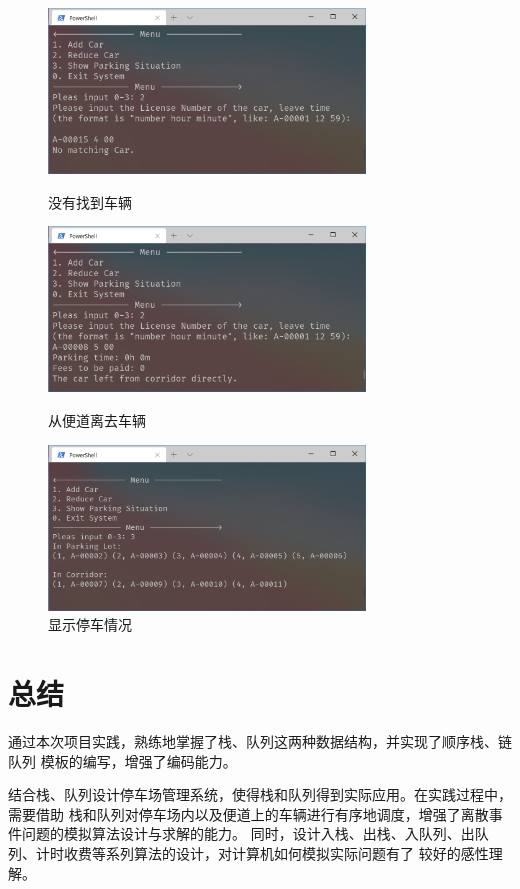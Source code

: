 \documentclass{ctexart}
\begin{document}
    \begin{figure}
        \centering
        \vspace{1em}
        \includegraphics[width=0.75\textwidth]{测试5.png}
        \caption{没有找到车辆}
        \vspace{1em}
        \includegraphics[width=0.75\textwidth]{测试6.png}
        \caption{从便道离去车辆}
        \vspace{1em}
        \includegraphics[width=0.75\textwidth]{测试7.png}
        \caption{显示停车情况}
    \end{figure}


    \section{总结}

    通过本次项目实践，熟练地掌握了栈、队列这两种数据结构，并实现了顺序栈、链队列
    模板的编写，增强了编码能力。

    结合栈、队列设计停车场管理系统，使得栈和队列得到实际应用。在实践过程中，需要借助
    栈和队列对停车场内以及便道上的车辆进行有序地调度，增强了离散事件问题的模拟算法设计与求解的能力。
    同时，设计入栈、出栈、入队列、出队列、计时收费等系列算法的设计，对计算机如何模拟实际问题有了
    较好的感性理解。
\end{document}
